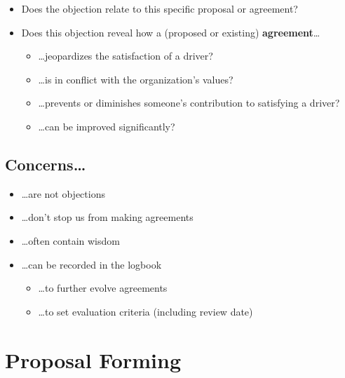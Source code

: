 \begin{itemize}
\item Does the objection relate to this specific proposal or agreement?

\item Does this objection reveal how a (proposed or existing) \textbf{agreement}{\ldots}

\begin{itemize}
\item {\ldots}jeopardizes the satisfaction of a driver?

\item {\ldots}is in conflict with the organization's values?

\item {\ldots}prevents or diminishes someone's contribution to satisfying a driver?

\item {\ldots}can be improved significantly?

\end{itemize}

\end{itemize}

\subsection{Concerns{\ldots}}
\label{concerns...}

\begin{itemize}
\item {\ldots}are not objections

\item {\ldots}don't stop us from making agreements

\item {\ldots}often contain wisdom

\item {\ldots}can be recorded in the logbook

\begin{itemize}
\item {\ldots}to further evolve agreements

\item {\ldots}to set evaluation criteria (including review date)

\end{itemize}

\end{itemize}

\section{Proposal Forming}
\label{proposalforming}

